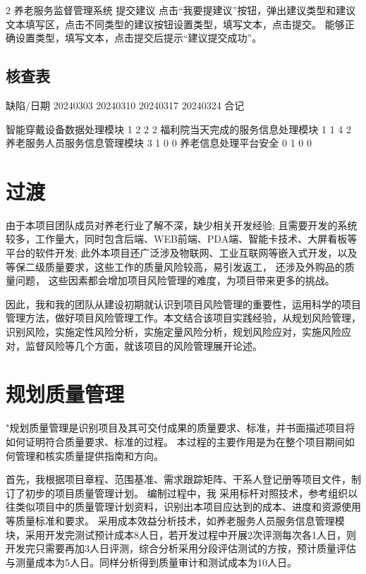 \documentclass[UTF8]{../computerUniverse}
\begin{document}
2       养老服务监督管理系统    提交建议
点击“我要提建议”按钮，弹出建议类型和建议文本填写区，点击不同类型的建议按钮设置类型，填写文本，点击提交。
能够正确设置类型，填写文本，点击提交后提示“建议提交成功”。


\subsection{核查表}

缺陷/日期   20240303    20240310    20240317    20240324    合记

智能穿戴设备数据处理模块    1           2       2       2
福利院当天完成的服务信息处理模块    1           1       4       2
养老服务人员服务信息管理模块    3           1       0       0
养老信息处理平台安全        0          1       0       0




\section{过渡}

由于本项目团队成员对养老行业了解不深，缺少相关开发经验;
且需要开发的系统较多，工作量大，同时包含后端、WEB前端、PDA端、智能卡技术、大屏看板等平台的软件开发;
此外本项目还广泛涉及物联网、工业互联网等嵌入式开发，以及等保二级质量要求，这些工作的质量风险较高，易引发返工，
还涉及外购品的质量问题，
这些因素都会增加项目风险管理的难度，为项目带来更多的挑战。

因此，我和我的团队从建设初期就认识到项目风险管理的重要性，运用科学的项目管理方法，做好项目风险管理工作。本文结合该项目实践经验，从规划风险管理，识别风险，实施定性风险分析，实施定量风险分析，规划风险应对，实施风险应对，监督风险等几个方面，就该项目的风险管理展开论述。

\section{规划质量管理}


"规划质量管理是识别项目及其可交付成果的质量要求、标准，并书面描述项目将如何证明符合质量要求、标准的过程。
本过程的主要作用是为在整个项目期间如何管理和核实质量提供指南和方向。

首先，我根据项目章程、范围基准、需求跟踪矩阵、干系人登记册等项目文件，制订了初步的项目质量管理计划。
编制过程中，我
采用标杆对照技术，参考组织以往类似项目中的质量管理计划资料，识别出本项目应达到的成本、进度和资源使用等质量标准和要求。
采用成本效益分析技术，如养老服务人员服务信息管理模块，采用开发完测试预计成本8人日，若开发过程中开展2次评测每次各1人日，则开发完只需要再加3人日评测，综合分析采用分段评估测试的方按，预计质量评估与测量成本为5人日。同样分析得到质量审计和测试成本为10人日。
\end{document}
